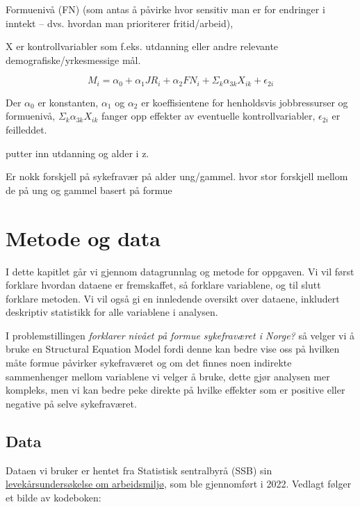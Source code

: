 \documentclass[
  12pt,
  a4paper,
  DIV=11,
  numbers=noendperiod]{scrartcl}
\begin{document}
Formuenivå (FN) (som antas å påvirke hvor sensitiv man er for endringer
i inntekt -- dvs. hvordan man prioriterer fritid/arbeid),

X er kontrollvariabler som f.eks. utdanning eller andre relevante
demografiske/yrkesmessige mål.

\[
M_i = \alpha_0 + \alpha_1 JR_i + \alpha_2 FN_i + \Sigma_k \alpha_{3k}X_{ik} + \epsilon_{2i}
\]

Der \(\alpha_0\) er konstanten, \(\alpha_1\) og \(\alpha_2\) er
koeffisientene for henholdsvis jobbressurser og formuenivå,
\(\Sigma_k \alpha_{3k}X_{ik}\) fanger opp effekter av eventuelle
kontrollvariabler, \(\epsilon_{2i}\) er feilleddet.

putter inn utdanning og alder i z.

Er nokk forskjell på sykefravær på alder ung/gammel. hvor stor forskjell
mellom de på ung og gammel basert på formue

\section{Metode og data}\label{metode-og-data}

I dette kapitlet går vi gjennom datagrunnlag og metode for oppgaven. Vi
vil først forklare hvordan dataene er fremskaffet, så forklare
variablene, og til slutt forklare metoden. Vi vil også gi en innledende
oversikt over dataene, inkludert deskriptiv statistikk for alle
variablene i analysen.

I problemstillingen \emph{forklarer nivået på formue sykefraværet i
Norge?} så velger vi å bruke en Structural Equation Model fordi denne
kan bedre vise oss på hvilken måte formue påvirker sykefraværet og om
det finnes noen indirekte sammenhenger mellom variablene vi velger å
bruke, dette gjør analysen mer kompleks, men vi kan bedre peke direkte
på hvilke effekter som er positive eller negative på selve sykefraværet.

\subsection{Data}\label{data}

Dataen vi bruker er hentet fra Statistisk sentralbyrå (SSB) sin
\href{https://www.ssb.no/arbeid-og-lonn/arbeidsmiljo-sykefravaer-og-arbeidskonflikter/artikler/levekarsundersokelsen-om-arbeidsmiljo-2022}{levekårsundersøkelse
om arbeidsmiljø}, som ble gjennomført i 2022. Vedlagt følger et bilde av
kodeboken:
\end{document}
